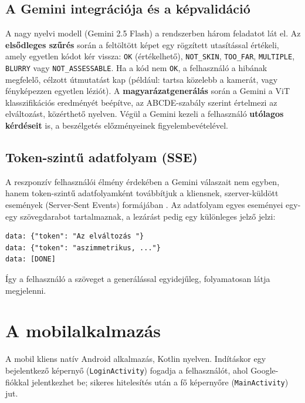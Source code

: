 \subsection{A Gemini integrációja és a képvalidáció}

A nagy nyelvi modell (Gemini 2.5 Flash) a rendszerben három feladatot lát el. Az
\textbf{elsődleges szűrés} során a feltöltött képet egy rögzített utasítással
értékeli, amely egyetlen kódot kér vissza: \texttt{OK} (értékelhető),
\texttt{NOT\_SKIN}, \texttt{TOO\_FAR}, \texttt{MULTIPLE}, \texttt{BLURRY} vagy
\texttt{NOT\_ASSESSABLE}. Ha a kód nem \texttt{OK}, a felhasználó a hibának
megfelelő, célzott útmutatást kap (például: tartsa közelebb a kamerát, vagy
fényképezzen egyetlen léziót). A \textbf{magyarázatgenerálás} során a Gemini a
ViT klasszifikációs eredményét beépítve, az ABCDE-szabály szerint értelmezi az
elváltozást, közérthető nyelven. Végül a Gemini kezeli a felhasználó
\textbf{utólagos kérdéseit} is, a beszélgetés előzményeinek figyelembevételével.

\subsection{Token-szintű adatfolyam (SSE)}

A reszponzív felhasználói élmény érdekében a Gemini válaszait nem egyben, hanem
token-szintű adatfolyamként továbbítjuk a kliensnek, szerver-küldött események
(Server-Sent Events) formájában \cite{whatwg_sse}. Az adatfolyam egyes
eseményei egy-egy szövegdarabot tartalmaznak, a lezárást pedig egy különleges
jelző jelzi:

\begin{verbatim}
data: {"token": "Az elváltozás "}
data: {"token": "aszimmetrikus, ..."}
data: [DONE]
\end{verbatim}

Így a felhasználó a szöveget a generálással egyidejűleg, folyamatosan látja
megjelenni.

\section{A mobilalkalmazás}

A mobil kliens natív Android alkalmazás, Kotlin nyelven. Indításkor egy
bejelentkező képernyő (\texttt{LoginActivity}) fogadja a felhasználót, ahol
Google-fiókkal jelentkezhet be; sikeres hitelesítés után a fő képernyőre
(\texttt{MainActivity}) jut.

